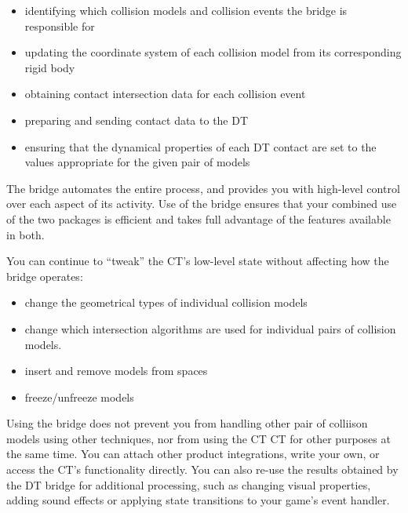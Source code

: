 \documentclass[11pt]{article}
\begin{document}
\begin{itemize}

\item identifying which collision models and collision events the bridge is responsible for

\item updating the coordinate system of each collision model from
its corresponding rigid body 

\item obtaining contact intersection data
for each collision event

\item preparing and sending contact data to the DT

\item ensuring that the dynamical properties of each DT contact 
are set to the values appropriate for the given pair of models

\end{itemize}

The bridge automates the entire process, and provides you with high-level
control over each aspect of its activity.
Use of the bridge ensures that your combined use of
the two packages is efficient and takes full advantage of the features available in both.

You can continue to ``tweak'' the CT's low-level state without affecting
how the bridge operates:

\begin{itemize}
\item change the geometrical types of individual collision models
\item change which intersection algorithms are used for individual pairs of
  collision models.
\item insert and remove models from spaces
\item freeze/unfreeze models
\end{itemize}



Using the bridge does not 
prevent you from handling other pair of colliison models using
other techniques, nor from using the CT 
CT for other purposes at
the same time. You can attach other product integrations, write your own,
or access the CT's functionality directly.
You can also re-use the results obtained by the DT bridge for additional
processing, such as changing visual properties, adding sound effects or
applying state transitions to your game's event handler.
\end{document}
